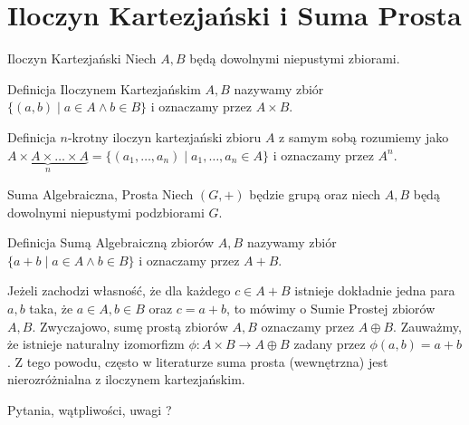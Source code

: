 \documentclass{beamer}
\begin{document}
\section{Iloczyn Kartezjański i Suma Prosta}
\begin{frame}{Iloczyn Kartezjański}
    Niech $A,B$ będą dowolnymi niepustymi zbiorami.
    \begin{block}{Definicja}
         \alert{Iloczynem Kartezjańskim} $A,B$ nazywamy zbiór
        $\{(a,b) \mid a \in A \land b \in B\}$ i oznaczamy przez $A \times B$.
    \end{block}
    \begin{block}{Definicja}
        $n$-krotny iloczyn kartezjański zbioru $A$ z samym sobą rozumiemy jako $ \underbrace{A \times A \times \ldots \times A}_{n} 
        = \{(a_1,\ldots, a_n) \mid a_1,\ldots,a_n \in A \}$ i oznaczamy  przez $A^n$.
    \end{block}
\end{frame}

\begin{frame}{Suma Algebraiczna, Prosta}
    Niech $(G, +)$ będzie grupą oraz niech $A,B$ będą dowolnymi niepustymi podzbiorami $G$.
    \begin{block}{Definicja}
        \alert{Sumą Algebraiczną} zbiorów $A,B$ nazywamy zbiór $\{ a + b \mid a \in A \land b \in B\}$
        i oznaczamy przez $A + B$.
    \end{block}
    Jeżeli zachodzi własność, że dla każdego $c \in A +B $ istnieje dokładnie jedna para $a,b$ taka, że $a \in A, b \in B$ oraz $c = a +b$, 
    to mówimy o \alert{Sumie Prostej} zbiorów $A,B$. Zwyczajowo, sumę prostą zbiorów $A,B$ oznaczamy przez $A \oplus B$. 
    \pause 
    Zauważmy, że istnieje naturalny izomorfizm  $ \phi : A \times B \rightarrow A \oplus B$ zadany przez
    $\phi(a,b) = a + b$. Z tego powodu, często w literaturze suma prosta (wewnętrzna) jest nierozróżnialna z iloczynem kartezjańskim. 
\end{frame}

\begin{frame}
        \centering 
        \LARGE Pytania, wątpliwości, uwagi ? 
\end{frame}
\end{document}
